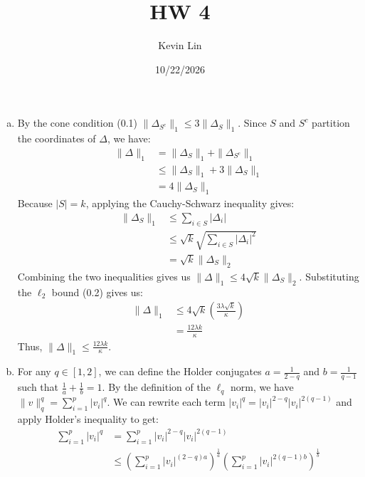 \documentclass[11pt,a4paper,margin=1in]{article}
\title{HW 4}
\author{Kevin Lin}
\date{10/22/2026}
\begin{document}
\maketitle

\section{}
\begin{enumerate}[(a)]
    \item By the cone condition (0.1) $\|\Delta_{S^c}\|_1 \leq 3\|\Delta_S\|_1$.
    Since $S$ and $S^c$ partition the coordinates of $\Delta$, we have:
    \begin{align*}
        \|\Delta\|_1 &= \|\Delta_S\|_1 + \|\Delta_{S^c}\|_1 \\
        &\leq \|\Delta_S\|_1 + 3\|\Delta_S\|_1 \\
        &= 4\|\Delta_S\|_1
    \end{align*}
    Because $|S| = k$, applying the Cauchy-Schwarz inequality gives:
    \begin{align*}
        \|\Delta_S\|_1 &\leq \sum_{i \in S} |\Delta_i| \\
        &\leq \sqrt{k}\sqrt{\sum_{i \in S} |\Delta_i|^2} \\
        &= \sqrt{k}\|\Delta_S\|_2
    \end{align*}
    Combining the two inequalities gives us $\|\Delta\|_1 \leq 4\sqrt{k}\|\Delta_S\|_2$.
    Substituting the $\ell_2$ bound (0.2) gives us:
    \begin{align*}
        \|\Delta\|_1 &\leq 4\sqrt{k}\left(\frac{3\lambda\sqrt{k}}{\kappa}\right) \\
        &= \frac{12\lambda k}{\kappa}
    \end{align*}
    Thus, $\|\Delta\|_1 \leq \frac{12\lambda k}{\kappa}$.
    \item For any $q \in [1,2]$, we can define the Holder conjugates $a = \frac{1}{2 - q}$
    and $b = \frac{1}{q - 1}$ such that $\frac{1}{a} + \frac{1}{b} = 1$. By the
    definition of the $\ell_q$ norm, we have $\|v\|_q^q = \sum_{i=1}^p |v_i|^q$.
    We can rewrite each term $|v_i|^q = |v_i|^{2-q}|v_i|^{2(q-1)}$ and apply 
    Holder's inequality to get:
    \begin{align*}
        \sum_{i=1}^p |v_i|^q &= \sum_{i=1}^p |v_i|^{2-q}|v_i|^{2(q-1)} \\
        &\leq \left(\sum_{i=1}^p |v_i|^{(2-q)a}\right)^{\frac{1}{a}}\left(\sum_{i=1}^p |v_i|^{2(q-1)b}\right)^{\frac{1}{b}} \\

\end{align*}
\end{enumerate}
\end{document}
